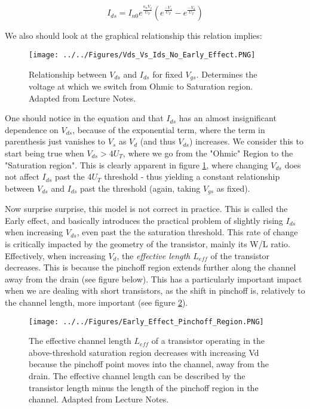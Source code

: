 \begin{equation}
I_{ds} = I_{n0} e^{\frac{\kappa_{n}V_g}{U_T}}(e^\frac{-V_s}{U_T} - e^\frac{-V_d}{U_T})
\end{equation}

We also should look at the graphical relationship this relation implies:

\begin{figure}[H]
    \centering
    \texttt{[image: ../../Figures/Vds\_Vs\_Ids\_No\_Early\_Effect.PNG]}
    \caption{Relationship between $V_{ds}$ and $I_{ds}$ for fixed $V_{gs}$. Determines the voltage at which we switch from Ohmic to Saturation region. Adapted from Lecture Notes.}
    \label{fig:vdsids}
\end{figure}

One should notice in the equation and that $I_{ds}$ has an almost insignificant dependence on $V_{ds}$, because of the exponential term, where the term in parenthesis just vanishes to $V_{s}$ as $V_{d}$ (and thus $V_{ds}$) increases. We consider this to start being true when $V_{ds} > 4U_T$, where we go from the "Ohmic" Region to the "Saturation region". This is clearly apparent in figure \ref{fig:vdsids}, where changing $V_{ds}$ does not affect $I_{ds}$ past the 4$U_T$ threshold - thus yielding a constant relationship between $V_{ds}$ and $I_{ds}$ past the threshold (again, taking $V_{gs}$ as fixed). 

Now surprise surprise, this model is not correct in practice. This is called the Early effect, and basically introduces the practical problem of slightly rising $I_{ds}$ when increasing $V_{ds}$, even past the the saturation threshold. This rate of change is critically impacted by the geometry of the transistor, mainly its W/L ratio. Effectively, when increasing $V_d$, the \emph{effective length $L_{eff}$} of the transistor decreases. This is because the pinchoff region extends further along the channel away from the drain (see figure below). This has a particularly important impact when we are dealing with short transistors, as the shift in pinchoff is, relatively to the channel length, more important (see figure \ref{fig:pinchoff}). 

\begin{figure}[H]
    \centering
    \texttt{[image: ../../Figures/Early\_Effect\_Pinchoff\_Region.PNG]}
    \caption{The effective channel length $L_{eff}$ of a transistor operating in the above-threshold saturation region decreases with increasing Vd because the pinchoff point moves into the channel, away from the drain. The effective channel length can be described by the transistor length minus the length of the pinchoff region in the channel. Adapted from Lecture Notes.}
    \label{fig:pinchoff}
\end{figure}

